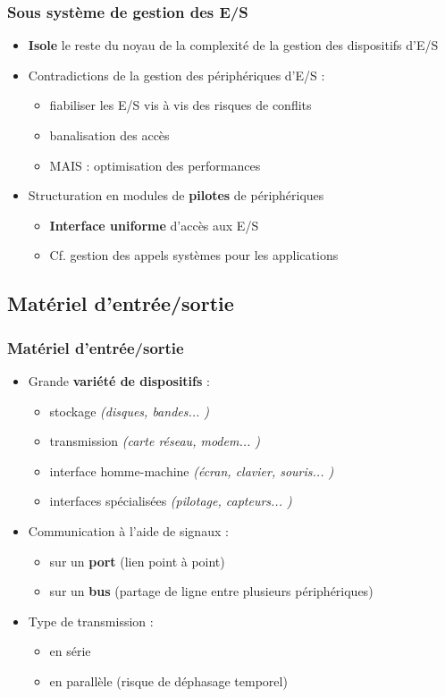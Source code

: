 \begin{frame}
\frametitle{Sous système de gestion des E/S}
\begin{itemize}
\item \textbf{Isole} le reste du noyau de la complexité de la gestion des dispositifs d'E/S
\item Contradictions de la gestion des périphériques d'E/S :
\begin{itemize}
\item fiabiliser les E/S vis à vis des risques de conflits
\item banalisation des accès
\item MAIS : optimisation des performances
\end{itemize}
\item Structuration en modules de \textbf{pilotes} de périphériques
\begin{itemize}
\item \textbf{Interface uniforme} d'accès aux E/S
\item Cf. gestion des appels systèmes pour les applications
\end{itemize}
\end{itemize}
\end{frame}

\subsection{Matériel d'entrée/sortie}

\begin{frame}
\frametitle{Matériel d'entrée/sortie}
\begin{itemize}
\item Grande \textbf{variété de dispositifs} :
\begin{itemize}
\item stockage \textit{(disques, bandes... )}
\item transmission \textit{(carte réseau, modem... )}
\item interface homme-machine \textit{(écran, clavier, souris... )}
\item interfaces spécialisées \textit{(pilotage, capteurs... )}
\end{itemize}
\item Communication à l'aide de signaux :
\begin{itemize}
\item sur un \textbf{port} (lien point à point)
\item sur un \textbf{bus} (partage de ligne entre plusieurs périphériques)
\end{itemize}
\item Type de transmission :
\begin{itemize}
\item en série
\item en parallèle (risque de déphasage temporel)
\end{itemize}
\end{itemize}
\end{frame}

